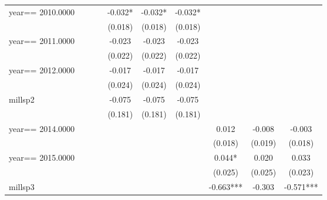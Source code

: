 \begin{table}[htbp]
\begin{tabular}{l*{9}{c}}
year==  2010.0000   &               &               &               &      -0.032*  &      -0.032*  &      -0.032*  &               &               &               \\
                    &               &               &               &     (0.018)   &     (0.018)   &     (0.018)   &               &               &               \\
year==  2011.0000   &               &               &               &      -0.023   &      -0.023   &      -0.023   &               &               &               \\
                    &               &               &               &     (0.022)   &     (0.022)   &     (0.022)   &               &               &               \\
year==  2012.0000   &               &               &               &      -0.017   &      -0.017   &      -0.017   &               &               &               \\
                    &               &               &               &     (0.024)   &     (0.024)   &     (0.024)   &               &               &               \\
millsp2             &               &               &               &      -0.075   &      -0.075   &      -0.075   &               &               &               \\
                    &               &               &               &     (0.181)   &     (0.181)   &     (0.181)   &               &               &               \\
year==  2014.0000   &               &               &               &               &               &               &       0.012   &      -0.008   &      -0.003   \\
                    &               &               &               &               &               &               &     (0.018)   &     (0.019)   &     (0.018)   \\
year==  2015.0000   &               &               &               &               &               &               &       0.044*  &       0.020   &       0.033   \\
                    &               &               &               &               &               &               &     (0.025)   &     (0.025)   &     (0.023)   \\
millsp3             &               &               &               &               &               &               &      -0.663***&      -0.303   &      -0.571***\\

\end{tabular}
\end{table}
